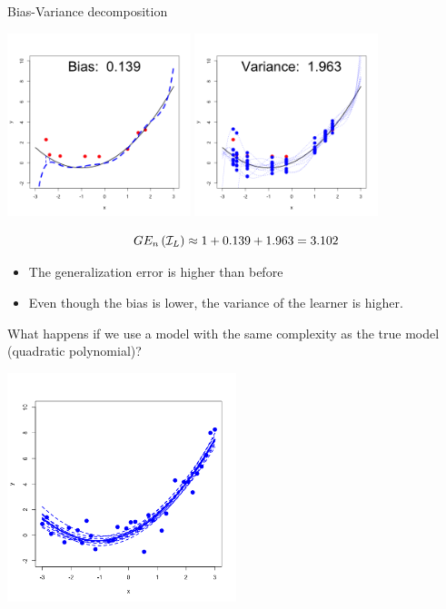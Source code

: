 \documentclass[11pt,compress,t,notes=noshow, xcolor=table]{beamer}
\begin{document}
\begin{vbframe} {Bias-Variance decomposition}
\begin{center}
  \includegraphics[width = 0.4\textwidth]{figure/bias_variance_decomposition-complex_model_bias.png}
  \includegraphics[width = 0.4\textwidth]{figure/bias_variance_decomposition-complex_model_variance.png}
\end{center}

$$GE_n\left(\mathcal{I}_{L}\right) \approx 1 + 0.139 + 1.963 = 3.102 $$

\begin{itemize}
  \item The generalization error is higher than before
  \item Even though the bias is lower, the variance of the learner is higher. 
\end{itemize}



\framebreak

What happens if we use a model with the same complexity as the true model (quadratic polynomial)? 

\begin{center}
  \includegraphics[width = 0.5\textwidth]{figure/bias_variance_decomposition-correct_model.png}
\end{center}


\end{vbframe}
\end{document}
